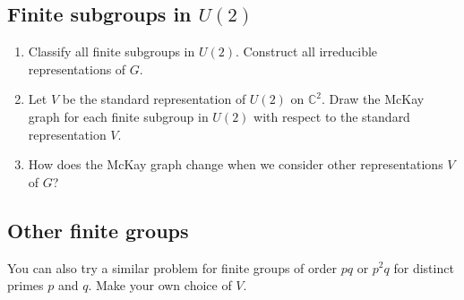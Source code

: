 \documentclass[12pt]{article}
\newcommand\cc{\mathbb{C}}
\theoremstyle{definition}
\theoremstyle{remark}
\begin{document}
\subsection{Finite subgroups in $U(2)$}
\begin{enumerate}
    \item Classify all finite subgroups in $U(2)$. Construct all irreducible representations of $G$.
    \item Let $V$ be the standard representation of $U(2)$ on $\cc^2$. Draw the McKay graph for each finite subgroup in $U(2)$ with respect to the standard representation $V$.
    \item How does the McKay graph change when we consider other representations $V$ of $G$? 
\end{enumerate}

\subsection{Other finite groups}
You can also try a similar problem for finite groups of order $pq$ or $p^2q$ for distinct primes $p$ and $q$. Make your own choice of $V$.
\end{document}
